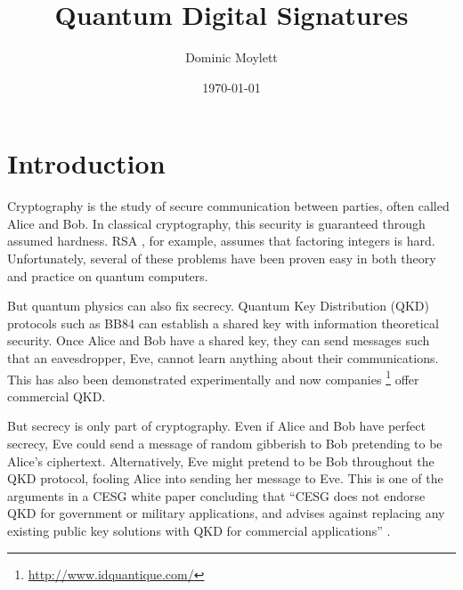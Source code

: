 \documentclass[%
 reprint,
 amsmath,amssymb,
 aps,
 pra,
]{revtex4-1}
\begin{document}
\title{Quantum Digital Signatures}

\author{Dominic Moylett}
%

\date{\today}%

\maketitle


\section{Introduction}
\label{sec:intro}

Cryptography is the study of secure communication between parties, often called Alice and Bob. In classical cryptography, this security is guaranteed through assumed hardness. RSA \cite{Rivest:1978:MOD:359340.359342}, for example, assumes that factoring integers is hard. Unfortunately, several of these problems have been proven easy in both theory \cite{Shor97} and practice \cite{MLL+12, 1604.05796} on quantum computers.

But quantum physics can also fix secrecy. Quantum Key Distribution (QKD) protocols such as BB84 \citep{BB84} can establish a shared key with information theoretical security. Once Alice and Bob have a shared key, they can send messages such that an eavesdropper, Eve, cannot learn anything about their communications. This has also been demonstrated experimentally \cite{Bennett1992, Sibson:15} and now companies \footnote{\url{http://www.idquantique.com/}} offer commercial QKD.

But secrecy is only part of cryptography. Even if Alice and Bob have perfect secrecy, Eve could send a message of random gibberish to Bob pretending to be Alice's ciphertext. Alternatively, Eve might pretend to be Bob throughout the QKD protocol, fooling Alice into sending her message to Eve. This is one of the arguments in a CESG white paper concluding that ``CESG does not endorse QKD for government or military applications, and advises against replacing any existing public key solutions with QKD for commercial applications'' \cite{CESG16}.
\end{document}
